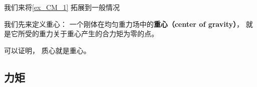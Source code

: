 
\begin{issues}
\issueDraft
\end{issues}


我们来将\autoref{ex_CM_1}  拓展到一般情况

我们先来定义重心： 一个刚体在均匀重力场中的\textbf{重心（center of gravity）}， 就是它所受的重力关于重心产生的合力矩为零的点。

可以证明， 质心就是重心。

\subsection{力矩}
